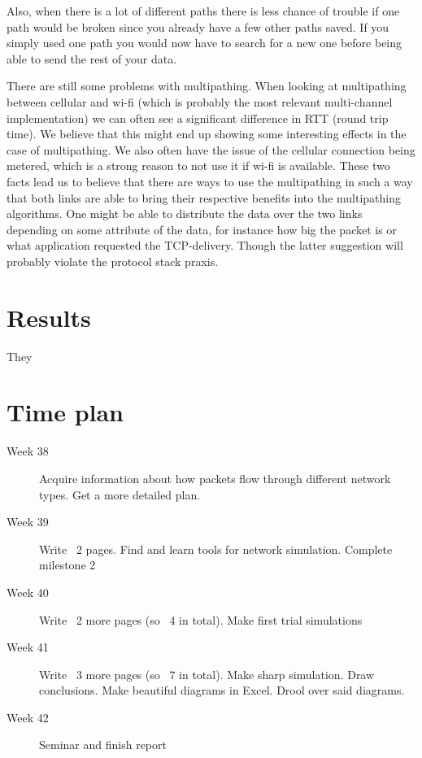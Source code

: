\documentclass[11pt,twocolumn]{article}
\begin{document}
Also, when there is a lot of different paths there is less chance of trouble if one path would be broken since you already have a few other paths saved. If you simply used one path you would now have to search for a new one before being able to send the rest of your data.

There are still some problems with multipathing. When looking at multipathing between cellular and wi-fi (which is probably the most relevant multi-channel implementation) we can often see a significant difference in RTT (round trip time). We believe that this might end up showing some interesting effects in the case of multipathing. We also often have the issue of the cellular connection being metered, which is a strong reason to not use it if wi-fi is available. These two facts lead us to believe that there are ways to use the multipathing in such a way that both links are able to bring their respective benefits into the multipathing algorithms. One might be able to distribute the data over the two links depending on some attribute of the data, for instance how big the packet is or what application requested the TCP-delivery. Though the latter suggestion will probably violate the protocol stack praxis.

\section{Results}

They 




\section{Time plan}
\begin{description}
\item[Week 38]
Acquire information about how packets flow through different network types. Get a more detailed plan.
\item[Week 39]
Write ~2 pages. Find and learn tools for network simulation. Complete milestone 2
\item[Week 40]
Write ~2 more pages (so ~4 in total). Make first trial simulations
\item[Week 41]
Write ~3 more pages (so ~7 in total). Make sharp simulation. Draw conclusions. Make beautiful diagrams in Excel. Drool over said diagrams.
\item[Week 42]
Seminar and finish report
\end{description}
\end{document}
